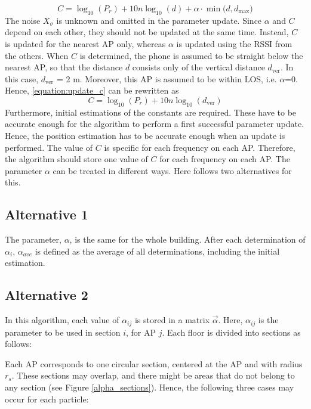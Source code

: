 \documentclass{LTHthesis}
\begin{document}
%
\begin{equation}
C = \log_{10}(P_r)+10n\log_{10}(d)+\alpha\cdot\min({d, d_{\text{max}})}
\label{equation:update_c}
\end{equation}
%
The noise $X_\sigma$ is unknown and omitted in the parameter update. 
%
Since $\alpha$ and $C$ depend on each other, they should not be updated at the same time. Instead, $C$ is updated for the nearest AP only, whereas $\alpha$ is updated using the RSSI from the others. When $C$ is determined, the phone is assumed to be straight below the nearest AP, so that the distance $d$ consists only of the vertical distance $d_{\text{ver}}$. In this case, $d_{\text{ver}}$ = 2 m. Moreover, this AP is assumed to be within LOS, i.e. $\alpha$=0. Hence, \ref{equation:update_c} can be rewritten as
%
\begin{equation}
C = \log_{10}(P_r)+10n\log_{10}(d_{\text{ver}})
\label{equation:update_c_simple}
\end{equation}
%
Furthermore, initial estimations of the constants are required. These have to be accurate enough for the algorithm to perform a first successful parameter update. Hence, the position estimation has to be accurate enough when an update is performed. 
%
The value of $C$ is specific for each frequency on each AP. Therefore, the algorithm should store one value of $C$ for each frequency on each AP.
The parameter $\alpha$ can be treated in different ways. Here follows two alternatives for this.

\subsection{Alternative 1}
The parameter, $\alpha$, is the same for the whole building. After each determination of $\alpha_i$, $\alpha_{ave}$ is defined as the average of all determinations, including the initial estimation.


%
\subsection{Alternative 2}
In this algorithm, each value of $\alpha_{ij}$ is stored in a matrix $\vec{\alpha}$. Here, $\alpha_{ij}$ is the parameter to be used in section $i$, for AP $j$. Each floor is divided into sections as follows:

Each AP corresponds to one circular section, centered at the AP and with radius $r_s$. These sections may overlap, and there might be areas that do not belong to any section (see Figure \ref{alpha_sections}). Hence, the following three cases may occur for each particle:
\end{document}
